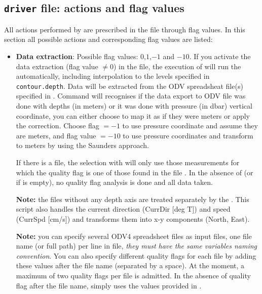 \pagebreak 

\subsection{{\tt driver} file: actions and flag values\label{driverflags}}

All actions performed by  are prescribed in the file  through flag values. In this section all possible actions and corresponding flag values are listed:

\begin{itemize}
\item {\bf Data extraction}: Possible flag values: $0$,$1$,$-1$ and $-10$. If you activate the data extraction (flag value $\neq 0$) in the  file, the execution of  will run the  automatically, including interpolation to the levels specified in {\tt contour.depth}. Data will be extracted from the ODV spreadsheat file(s) specified in . Command  will recognises if the data export to ODV file was done with depths (in meters) or it was done with pressure (in dbar) vertical coordinate, you can either choose to map it as if they were meters or apply the \citet{SAUNDERS81} correction. Choose flag $=-1$ to use pressure coordinate and assume they are meters, and flag value $=-10$ to use pressure coordinates and transform to meters by using the Saunders approach.

If there is a  file, the selection with  will only use those measurements for which the quality flag is one of those found in the file . In the absence of  (or if  is empty), no quality flag analysis is done and all data taken.

{\bf Note:} the files without any depth axis are treated separately by the . This script also handles the current direction (CurrDir [deg T]) and speed (CurrSpd [cm/s]) and transforms them into x-y components (North, East). 

{\bf Note:} you can specify several ODV4 spreadsheet files as input files, one file name (or full path) per line in  file, {\it they must have the same variables naming convention}. You can also specify different quality flags for each file by adding these values after the file name (separated by a space). At the moment, a maximum of two quality flags per file is admitted. In the absence of quality flag after the file name,  simply uses the values provided in .


\end{itemize}
